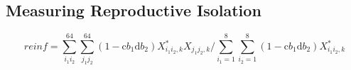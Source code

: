 \documentclass[11pt]{article}
\begin{document}
\subsection*{Measuring Reproductive Isolation}
\begin{equation}\label{Eq:eq4}
reinf = \sum_{i_1 i_2}^{64} \sum_{j_1 j_2}^{64} (1 - \text{c} b_1 \text{d} b_2) X^*_{i_1 i_2, k} X_{j_1 j_2, k}/ \sum_{i_1 =1}^{8} \sum_{i_2=1}^{8} (1 - \text{c} b_1 \text{d} b_2) X^*_{i_1 i_2, k}
\end{equation}  




\newpage


\end{document}
